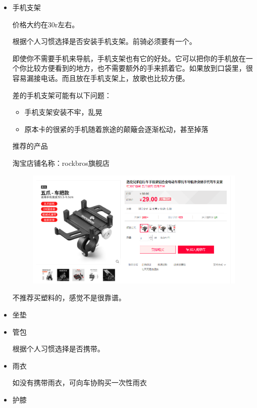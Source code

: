 \documentclass{ctexbook}
\begin{document}
\begin{itemize}
        \item 手机支架  
    
        价格大约在30r左右。

        根据个人习惯选择是否安装手机支架。前骑必须要有一个。

        即使你不需要手机来导航，手机支架也有它的好处。它可以把你的手机放在一个你比较方便看到的地方，也不需要额外的手来抓着它。如果放到口袋里，很容易漏接电话。而且放在手机支架上，放歌也比较方便。

        差的手机支架可能有以下问题：
        \begin{itemize}
            \item 手机支架安装不牢，乱晃
            \item 原本卡的很紧的手机随着旅途的颠簸会逐渐松动，甚至掉落
        \end{itemize}

        推荐的产品

        淘宝店铺名称：rockbros旗舰店

        \begin{figure}[H]
            \begin{center}
            \includegraphics[scale=0.3]{fig/洛克兄弟_手机支架.png}
            \end{center}
        \end{figure}
        不推荐买塑料的，感觉不是很靠谱。

        \item 坐垫
        \item 管包 
        
        根据个人习惯选择是否携带。
        \item 雨衣    
        
        如没有携带雨衣，可向车协购买一次性雨衣
        \item 护膝
        

\end{itemize}
\end{document}
